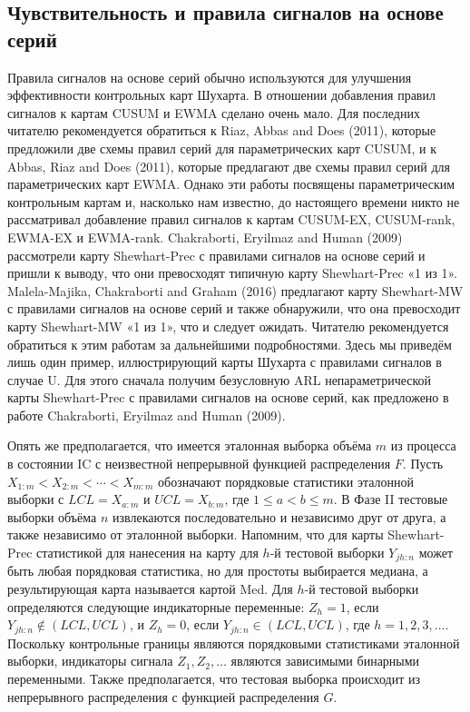 \subsection{Чувствительность и правила сигналов на основе серий}
Правила сигналов на основе серий обычно используются для улучшения эффективности контрольных карт Шухарта. В отношении добавления правил сигналов к картам CUSUM и EWMA сделано очень мало. Для последних читателю рекомендуется обратиться к Riaz, Abbas and Does (2011), которые предложили две схемы правил серий для параметрических карт CUSUM, и к Abbas, Riaz and Does (2011), которые предлагают две схемы правил серий для параметрических карт EWMA. Однако эти работы посвящены параметрическим контрольным картам и, насколько нам известно, до настоящего времени никто не рассматривал добавление правил сигналов к картам CUSUM-EX, CUSUM-rank, EWMA-EX и EWMA-rank. Chakraborti, Eryilmaz and Human (2009) рассмотрели карту Shewhart-Prec с правилами сигналов на основе серий и пришли к выводу, что они превосходят типичную карту Shewhart-Prec «1 из 1». Malela-Majika, Chakraborti and Graham (2016) предлагают карту Shewhart-MW с правилами сигналов на основе серий и также обнаружили, что она превосходит карту Shewhart-MW «1 из 1», что и следует ожидать. Читателю рекомендуется обратиться к этим работам за дальнейшими подробностями. Здесь мы приведём лишь один пример, иллюстрирующий карты Шухарта с правилами сигналов в случае U. Для этого сначала получим безусловную ARL непараметрической карты Shewhart-Prec с правилами сигналов на основе серий, как предложено в работе Chakraborti, Eryilmaz and Human (2009).

Опять же предполагается, что имеется эталонная выборка объёма \(m\) из процесса в состоянии IC с неизвестной непрерывной функцией распределения \(F\). Пусть \(X_{1:m} < X_{2:m} < \cdots < X_{m:m}\) обозначают порядковые статистики эталонной выборки с \(LCL = X_{a:m}\) и \(UCL = X_{b:m}\), где \(1 \le a < b \le m\). В Фазе II тестовые выборки объёма \(n\) извлекаются последовательно и независимо друг от друга, а также независимо от эталонной выборки. Напомним, что для карты Shewhart-Prec статистикой для нанесения на карту для \(h\)-й тестовой выборки \(Y_{jh:n}\) может быть любая порядковая статистика, но для простоты выбирается медиана, а результирующая карта называется картой Med. Для \(h\)-й тестовой выборки определяются следующие индикаторные переменные: \(Z_h = 1\), если \(Y_{jh:n} \notin (LCL, UCL)\), и \(Z_h = 0\), если \(Y_{jh:n} \in (LCL, UCL)\), где \(h = 1, 2, 3, \ldots\). Поскольку контрольные границы являются порядковыми статистиками эталонной выборки, индикаторы сигнала \(Z_1, Z_2, \ldots\) являются зависимыми бинарными переменными. Также предполагается, что тестовая выборка происходит из непрерывного распределения с функцией распределения \(G\).

